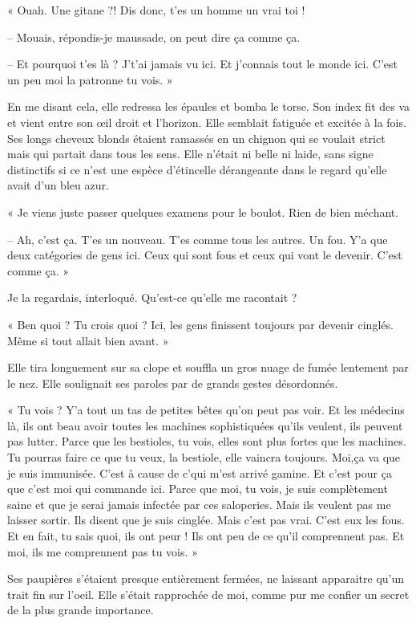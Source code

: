 « Ouah. Une gitane ?! Dis donc, t'es un homme un vrai toi !

-- Mouais, répondis-je maussade, on peut dire ça comme ça.

-- Et pourquoi t'es là ? J't'ai jamais vu ici. Et j'connais tout le monde ici. C'est un peu moi la patronne tu vois. »

En me disant cela, elle redressa les épaules et bomba le torse. Son index fit des va et vient entre son œil droit et 
l'horizon. Elle semblait fatiguée et excitée à la fois. Ses longs cheveux blonds étaient ramassés en un chignon qui se 
voulait strict mais qui partait dans tous les sens. Elle n'était ni belle ni laide, sans signe distinctifs si ce n'est 
une espèce d'étincelle dérangeante dans le regard qu'elle avait d'un bleu azur.

« Je viens juste passer quelques examens pour le boulot. Rien de bien méchant.

-- Ah, c'est ça. T'es un nouveau. T'es comme tous les autres. Un fou. Y'a que deux catégories de gens ici. Ceux qui 
sont fous et ceux qui vont le devenir. C'est comme ça. »

Je la regardais, interloqué. Qu'est-ce qu'elle me racontait ?

« Ben quoi ? Tu crois quoi ? Ici, les gens finissent toujours par devenir cinglés. Même si tout allait bien avant. »

Elle tira longuement sur sa clope et souffla un gros nuage de fumée lentement par le nez. Elle soulignait ses paroles 
par de grands gestes désordonnés.

« Tu vois ? Y'a tout un tas de petites bêtes qu'on peut pas voir. Et les médecins là, ils ont beau avoir toutes les 
machines sophistiquées qu'ils veulent, ils peuvent pas lutter. Parce que les bestioles, tu vois, elles sont plus fortes 
que les machines. Tu pourras faire ce que tu veux, la bestiole, elle vaincra toujours. Moi,ça va que je suis immunisée. 
C'est à cause de c'qui m'est arrivé gamine. Et c'est pour ça que c'est moi qui commande ici. Parce que moi, tu vois, je 
suis complètement saine et que je serai jamais infectée par ces saloperies. Mais ils veulent pas me laisser sortir. Ils 
disent que je suis cinglée. Mais c'est pas vrai. C'est eux les fous. Et en fait, tu sais quoi, ils ont peur ! Ils ont 
peu de ce qu'il comprennent pas. Et moi, ils me comprennent pas tu vois. »

Ses paupières s'étaient presque entièrement fermées, ne laissant apparaitre qu'un trait fin sur l'oeil. Elle s'était 
rapprochée de moi, comme pur me confier un secret de la plus grande importance.

